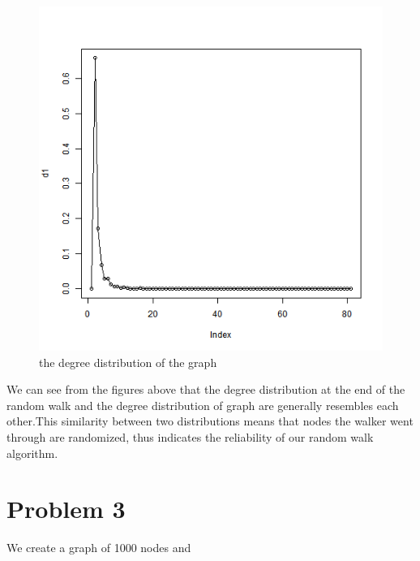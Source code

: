 \documentclass{article}
\begin{document}
\begin{figure}[htbp]
\centering
\includegraphics[width=.6\textwidth]{Q2a_1.png}
\caption{the degree distribution of the graph}
\label{fig:p2_e2}
\end{figure}
\noindent We can see from the figures above that the degree distribution at the end of the random walk and the degree distribution of graph are generally resembles each other.This similarity between two distributions means that nodes the walker went through are randomized, thus indicates the reliability of our random walk algorithm.
\newpage
\section{Problem 3}
We create a graph of 1000 nodes and 
\end{document}
